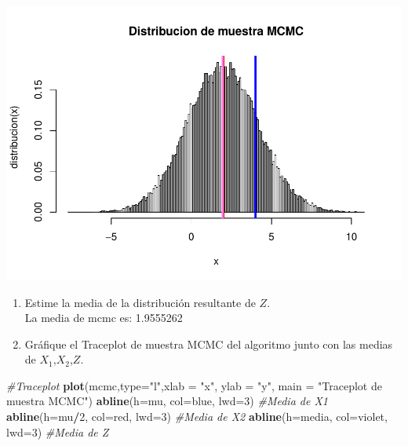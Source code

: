 \documentclass[
]{article}
\newenvironment{Shaded}{\begin{snugshade}}{\end{snugshade}}
\newcommand{\AttributeTok}[1]{\textcolor[rgb]{0.13,0.29,0.53}{#1}}
\newcommand{\CommentTok}[1]{\textcolor[rgb]{0.56,0.35,0.01}{\textit{#1}}}
\newcommand{\DecValTok}[1]{\textcolor[rgb]{0.00,0.00,0.81}{#1}}
\newcommand{\FunctionTok}[1]{\textcolor[rgb]{0.13,0.29,0.53}{\textbf{#1}}}
\newcommand{\NormalTok}[1]{#1}
\newcommand{\SpecialCharTok}[1]{\textcolor[rgb]{0.81,0.36,0.00}{\textbf{#1}}}
\newcommand{\StringTok}[1]{\textcolor[rgb]{0.31,0.60,0.02}{#1}}
\begin{document}
\includegraphics{tarea2_files/figure-latex/unnamed-chunk-14-1.pdf}

\begin{enumerate}
\def\labelenumi{\alph{enumi}.}
\setcounter{enumi}{2}
\item
  Estime la media de la distribución resultante de \(𝑍\).\\
  La media de mcmc es: 1.9555262
\item
  Gráfique el Traceplot de muestra MCMC del algoritmo junto con las
  medias de \(𝑋_1\),\(𝑋_2\),\(𝑍\).
\end{enumerate}

\begin{Shaded}
\begin{Highlighting}[]
\CommentTok{\#Traceplot}
\FunctionTok{plot}\NormalTok{(mcmc,}\AttributeTok{type=}\StringTok{"l"}\NormalTok{,}\AttributeTok{xlab =} \StringTok{"x"}\NormalTok{, }\AttributeTok{ylab =} \StringTok{"y"}\NormalTok{, }\AttributeTok{main =} \StringTok{"Traceplot de muestra MCMC"}\NormalTok{)}
\FunctionTok{abline}\NormalTok{(}\AttributeTok{h=}\NormalTok{mu, }\AttributeTok{col=}\StringTok{\textquotesingle{}blue\textquotesingle{}}\NormalTok{, }\AttributeTok{lwd=}\DecValTok{3}\NormalTok{)      }\CommentTok{\#Media de X1}
\FunctionTok{abline}\NormalTok{(}\AttributeTok{h=}\NormalTok{mu}\SpecialCharTok{/}\DecValTok{2}\NormalTok{, }\AttributeTok{col=}\StringTok{\textquotesingle{}red\textquotesingle{}}\NormalTok{, }\AttributeTok{lwd=}\DecValTok{3}\NormalTok{)     }\CommentTok{\#Media de X2}
\FunctionTok{abline}\NormalTok{(}\AttributeTok{h=}\NormalTok{media, }\AttributeTok{col=}\StringTok{\textquotesingle{}violet\textquotesingle{}}\NormalTok{, }\AttributeTok{lwd=}\DecValTok{3}\NormalTok{) }\CommentTok{\#Media de Z}
\end{Highlighting}
\end{Shaded}
\end{document}
